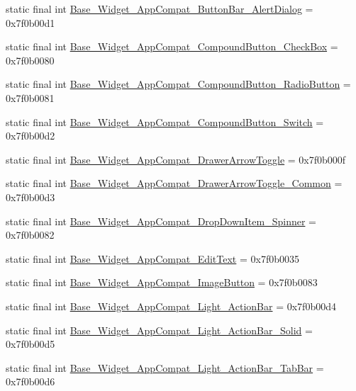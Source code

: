 \begin{CompactItemize}
static final int \hyperlink{classandroid_1_1support_1_1v4_1_1_r_1_1style_3f1395d435797d395f4cdb5a83e0c0a9}{Base\_\-Widget\_\-AppCompat\_\-ButtonBar\_\-AlertDialog} = 0x7f0b00d1
\item 
static final int \hyperlink{classandroid_1_1support_1_1v4_1_1_r_1_1style_9f38b145460d6886c0a08436e71cc1e0}{Base\_\-Widget\_\-AppCompat\_\-CompoundButton\_\-CheckBox} = 0x7f0b0080
\item 
static final int \hyperlink{classandroid_1_1support_1_1v4_1_1_r_1_1style_89176bd7064b54c4b4d167b31590bea6}{Base\_\-Widget\_\-AppCompat\_\-CompoundButton\_\-RadioButton} = 0x7f0b0081
\item 
static final int \hyperlink{classandroid_1_1support_1_1v4_1_1_r_1_1style_64b282a7b93035bebc246daaf5ca0250}{Base\_\-Widget\_\-AppCompat\_\-CompoundButton\_\-Switch} = 0x7f0b00d2
\item 
static final int \hyperlink{classandroid_1_1support_1_1v4_1_1_r_1_1style_04134ed11f3cff62ce87dbfdbb861770}{Base\_\-Widget\_\-AppCompat\_\-DrawerArrowToggle} = 0x7f0b000f
\item 
static final int \hyperlink{classandroid_1_1support_1_1v4_1_1_r_1_1style_bfd625bdb846739d90e02cc9936a4466}{Base\_\-Widget\_\-AppCompat\_\-DrawerArrowToggle\_\-Common} = 0x7f0b00d3
\item 
static final int \hyperlink{classandroid_1_1support_1_1v4_1_1_r_1_1style_124826a142aadbd0495d115d914e781f}{Base\_\-Widget\_\-AppCompat\_\-DropDownItem\_\-Spinner} = 0x7f0b0082
\item 
static final int \hyperlink{classandroid_1_1support_1_1v4_1_1_r_1_1style_00b74b40ec4fe91117ca56c4a559c211}{Base\_\-Widget\_\-AppCompat\_\-EditText} = 0x7f0b0035
\item 
static final int \hyperlink{classandroid_1_1support_1_1v4_1_1_r_1_1style_9fea8516fed089b30fd4776d6f9499c6}{Base\_\-Widget\_\-AppCompat\_\-ImageButton} = 0x7f0b0083
\item 
static final int \hyperlink{classandroid_1_1support_1_1v4_1_1_r_1_1style_27a5830d1b3ffefd035fe9ab56ac9873}{Base\_\-Widget\_\-AppCompat\_\-Light\_\-ActionBar} = 0x7f0b00d4
\item 
static final int \hyperlink{classandroid_1_1support_1_1v4_1_1_r_1_1style_ecfdc7c5986cb7c3d940f3627dfacd66}{Base\_\-Widget\_\-AppCompat\_\-Light\_\-ActionBar\_\-Solid} = 0x7f0b00d5
\item 
static final int \hyperlink{classandroid_1_1support_1_1v4_1_1_r_1_1style_d0ea4447e56445c20022cda79b1eea0b}{Base\_\-Widget\_\-AppCompat\_\-Light\_\-ActionBar\_\-TabBar} = 0x7f0b00d6

\end{CompactItemize}
